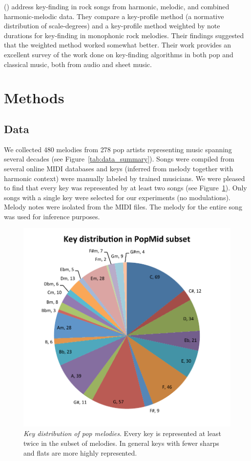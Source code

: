 \documentclass[letterpaper]{article}
\begin{document}
\citeauthor{temperley2013statistical} (\citeyear{temperley2013statistical}) address key-finding in rock songs from harmonic, melodic, and combined harmonic-melodic data. They compare a key-profile method (a normative distribution of scale-degrees) and a key-profile method weighted by note durations for key-finding in monophonic rock melodies. Their findings suggested that the weighted method worked somewhat better. Their work provides an excellent survey of the work done on key-finding algorithms in both pop and classical music, both from audio and sheet music.

\section{Methods}

\subsection{Data}

We collected 480 melodies from 278 pop artists representing music spanning several decades (see Figure~\ref{tab:data_summary}). Songs were compiled from several online MIDI databases and keys (inferred from melody together with harmonic context) were manually labeled by trained musicians. We were pleased to find that every key was represented by at least two songs (see Figure~\ref{fig:key_distribution}). Only songs with a single key were selected for our experiments (no modulations). Melody notes were isolated from the MIDI files. The melody for the entire song was used for inference purposes.

\begin{figure}
  \centering
 \includegraphics[width=.4\textwidth]{./key_distribution.pdf}
  \caption{\emph{Key distribution of pop melodies}. Every key is represented at least twice in the subset of melodies. In general keys with fewer sharps and flats are more highly represented.}
  \label{fig:key_distribution}
\end{figure}
\end{document}
